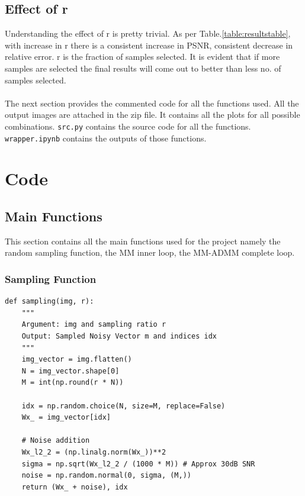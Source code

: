 \documentclass[12pt,a4paper,onecolumn]{exam}
\begin{document}
\subsection{Effect of r}
Understanding the effect of r is pretty trivial. As per Table.\ref{table:resultstable}, with increase in r there is a consistent increase in PSNR, consistent decrease in relative error. r is the fraction of samples selected. It is evident that if more samples are selected the final results will come out to better than less no. of samples selected. 
\phantom{123}\\
\phantom{123}\\
The next section provides the commented code for all the functions used. All the output images are attached in the zip file. It contains all the plots for all possible combinations. \verb|src.py| contains the source code for all the functions. \verb|wrapper.ipynb| contains the outputs of those functions.   

\newpage
\appendix
\section{Code}

\subsection{Main Functions}
This section contains all the main functions used for the project namely the random sampling function, the MM inner loop, the MM-ADMM  complete loop.
\subsubsection{Sampling Function}
\begin{lstlisting}[label=code:samplingfunction]
def sampling(img, r):
    """
    Argument: img and sampling ratio r
    Output: Sampled Noisy Vector m and indices idx
    """
    img_vector = img.flatten() 
    N = img_vector.shape[0] 
    M = int(np.round(r * N)) 
    
    idx = np.random.choice(N, size=M, replace=False) 
    Wx_ = img_vector[idx] 

    # Noise addition
    Wx_l2_2 = (np.linalg.norm(Wx_))**2 
    sigma = np.sqrt(Wx_l2_2 / (1000 * M)) # Approx 30dB SNR
    noise = np.random.normal(0, sigma, (M,)) 
    return (Wx_ + noise), idx 
\end{lstlisting}
\end{document}

